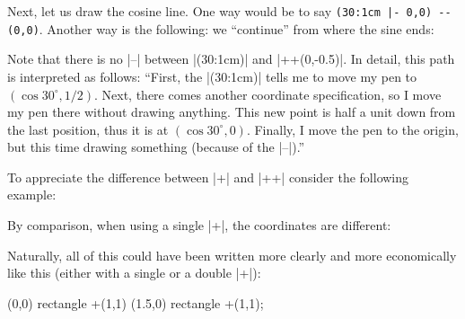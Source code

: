 Next, let us draw the cosine line. One way would be to say
\verb!(30:1cm |- 0,0) -- (0,0)!. Another way is the following: we ``continue''
from where the sine ends:
%
\begin{codeexample}[]
\end{codeexample}

Note that there is no |--| between |(30:1cm)| and |++(0,-0.5)|. In detail, this
path is interpreted as follows: ``First, the |(30:1cm)| tells me to move my pen
to $(\cos 30^\circ,1/2)$. Next, there comes another coordinate specification,
so I move my pen there without drawing anything. This new point is half a unit
down from the last position, thus it is at $(\cos 30^\circ,0)$. Finally, I move
the pen to the origin, but this time drawing something (because of the |--|).''

To appreciate the difference between |+| and |++| consider the following
example:
%
\begin{codeexample}[]
\end{codeexample}

By comparison, when using a single |+|, the coordinates are different:
%
\begin{codeexample}[]
\end{codeexample}


Naturally, all of this could have been written more clearly and more
economically like this (either with a single or a double |+|):
%
\begin{codeexample}[]
\tikz \draw (0,0) rectangle +(1,1)  (1.5,0) rectangle +(1,1);
\end{codeexample}


